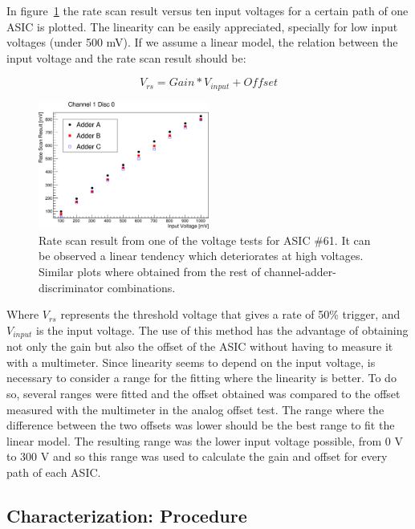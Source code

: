 \documentclass[a4paper,10pt]{book}
\begin{document}
In figure~\ref{fig:linearfit} the rate scan result versus ten input voltages for a certain path of one ASIC is plotted. The linearity can be easily appreciated, specially for low input voltages (under 500 mV).
If we assume a linear model, the relation between the input voltage and the rate scan result should be:

\begin{equation}
\label{eq:fit}
V_{rs} = Gain*V_{input} + Offset
\end{equation}


\begin{figure}
\centering
 \includegraphics[width=0.5\textwidth]{./linearfit.png}
  \caption{Rate scan result from one of the voltage tests for ASIC \#61. It can be observed a linear tendency which deteriorates at high voltages. 
  Similar plots where obtained from the rest of channel-adder-discriminator combinations. }
    \label{fig:linearfit}
\end{figure}

Where $V_{rs}$ represents the threshold voltage that gives a rate of 50\% trigger, and $V_{input}$ is the input voltage. The use of this method has the advantage of obtaining not only
the gain but also the offset of the ASIC without having to measure it with a multimeter. 
Since linearity seems to depend on the input voltage, is necessary to consider a range for the fitting where the linearity is better. To do so, several ranges were fitted and the offset obtained
was compared to the offset measured with the multimeter in the analog offset test. The range where the difference between the two offsets was lower should be the best range
to fit the linear model. The resulting range was the lower input voltage possible, from 0 V to 300 V and so this range was used to calculate the gain and 
offset for every path of each ASIC. 


\subsection{Characterization: Procedure}
\end{document}
